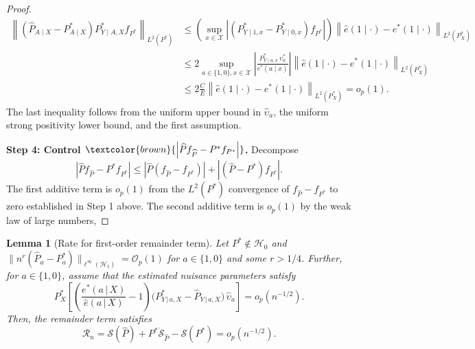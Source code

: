 \documentclass{article}
\theoremstyle{plain}
\newtheorem{lemma}[theorem]{Lemma}
\theoremstyle{definition}
\theoremstyle{remark}
\newcommand{\of}[1]{\left(#1\right)}
\newcommand{\off}[1]{\left[#1\right]}
\newcommand{\abs}[1]{\left|#1\right|}
\newcommand{\cH}{\mathcal{H}}
\newcommand{\cR}{\mathcal{R}}
\newcommand{\cO}{\mathcal{O}}
\newcommand{\cX}{\mathcal{X}}
\newcommand{\ucH}{\mathscr{H}}
\newcommand{\wh}[1]{\widehat{#1}}
\newcommand{\hP}{\widehat{P}}
\newcommand{\1}{\mathbbm{1}}
\newcommand{\STE}{\mathscr{S}}
\newcommand{\norm}[1]{\left \| #1 \right \|}
\theoremstyle{plain}
\theoremstyle{definition}
\newcommand{\mymid}{\,|\,}
\begin{document}
\begin{proof}
\begin{align*}
         \norm{(\hP_{A \mid X} - P^*_{A \mid X}) P^*_{Y \mid A, X} f_{P^*}}_{L^2(P^*)} &\leq \of{\sup_{x \in \cX} \abs{\of{P^*_{Y \mid 1, x} - P^*_{Y \mid 0, x}} f_{P^*}}} \norm{\hat{e}(1 \mid \cdot) - {e}^*(1 \mid \cdot)}_{L^2(P^*_X)}\\
         &\leq 2 \sup_{a \in \{1,0\}, x \in \cX} \abs{\frac{P^*_{Y \mid a, x}\, \upsilon_a^*}{e^*(a \mid x)}} \norm{\hat{e}(1 \mid \cdot) - {e}^*(1 \mid \cdot)}_{L^2(P^*_X)}\\
         &\leq 2 \frac{C}{E} \norm{\hat{e}(1 \mid \cdot) - {e}^*(1 \mid \cdot)}_{L^2(P^*_X)} = o_p(1).
    \end{align*}
    The last inequality follows from the uniform upper bound in $\wh{\upsilon}_a$, the uniform strong positivity lower bound, and the first assumption.
    
    \textbf{Step 4: Control  $\textcolor{brown}{\abs{\hP f_{\hP} - P^* f_{P^*}}}$.} Decompose
    \[
    \abs{\hP f_{\hP}- P^* f_{P^*}} \leq \abs{\hP (f_{\hP} - f_{P^*})} + \abs{(\hP - P^*)f_{P^*}}.
    \]
    The first additive term is $o_p(1)$ from the $L^2(P^*)$ convergence of $f_{\hP} - f_{P^*}$ to zero established in Step 1 above.
    The second additive term is $o_p(1)$ by the weak law of large numbers, 
    \end{proof}
\begin{lemma}[Rate for first-order remainder term]\label{lem:first_order_remainder_term}
    Let $P^* \notin \ucH_0$ and $\|n^r(\hP_a - P^*_a)\|_{\ell^\infty(\cH_1)} = \cO_p(1)$ for $a \in \{1,0\}$ and some $r > 1/4$. Further, for $a \in \{1,0\}$, assume that the estimated nuisance parameters satisfy 
        \[
        P^*_{X}\off{ \of{\frac{e^*(a \mymid X)}{\hat{e}(a \mymid X)}-1} \big({P^*_{Y \mymid a, X} - \hP_{Y \mymid a, X}}\big) \, \wh{\upsilon}_a} = o_p(n^{-1/2}).
        \]
    Then, the remainder term satisfies
    \[
    \cR_n = \STE(\hP) + P^* \dot{\STE}_{\hP} - \STE(P^*) = o_p(n^{-1/2}).
    \]
\end{lemma}
\end{document}
